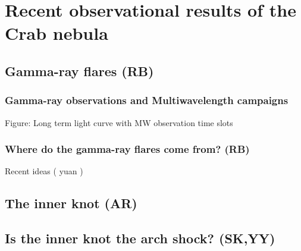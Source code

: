 \section{Recent observational results of the Crab nebula}
\subsection{Gamma-ray flares (RB)}
\subsubsection{Gamma-ray observations and Multiwavelength campaigns}
Figure: Long term light curve with MW observation time slots
\subsubsection{Where do the gamma-ray flares come from?                  (RB)}
Recent ideas ( \cite{2016arXiv160403179Y}\cite{2015arXiv151205426Z}yuan\cite{2016arXiv160304850N}\cite{2016arXiv160305731L} )
\subsection{The inner knot   (AR)}
\subsection{Is the inner knot the arch shock?                                      (SK,YY)}

